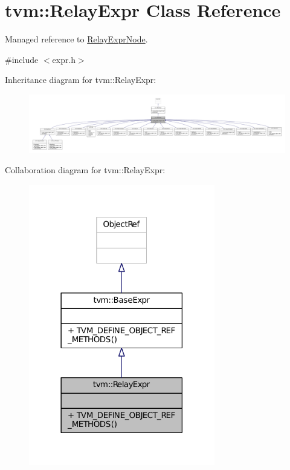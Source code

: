 \hypertarget{classtvm_1_1RelayExpr}{}\section{tvm\+:\+:Relay\+Expr Class Reference}
\label{classtvm_1_1RelayExpr}


Managed reference to \hyperlink{classtvm_1_1RelayExprNode}{Relay\+Expr\+Node}.  




{\ttfamily \#include $<$expr.\+h$>$}



Inheritance diagram for tvm\+:\+:Relay\+Expr\+:
\nopagebreak
\begin{figure}[H]
\begin{center}
\leavevmode
\includegraphics[width=350pt]{classtvm_1_1RelayExpr__inherit__graph}
\end{center}
\end{figure}


Collaboration diagram for tvm\+:\+:Relay\+Expr\+:
\nopagebreak
\begin{figure}[H]
\begin{center}
\leavevmode
\includegraphics[width=230pt]{classtvm_1_1RelayExpr__coll__graph}
\end{center}
\end{figure}
